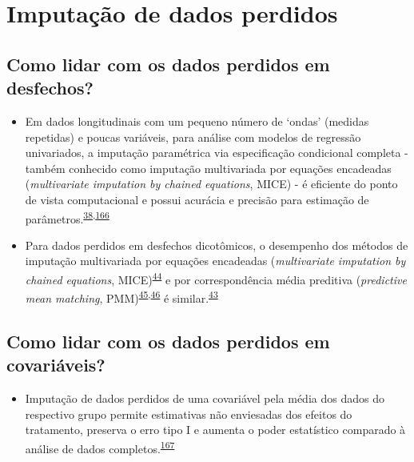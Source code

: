 \documentclass[
  a4paper,
]{book}
\providecommand{\tightlist}{%
  \setlength{\itemsep}{0pt}\setlength{\parskip}{0pt}}
\begin{document}
\hypertarget{imputacao-dados}{%
\section{Imputação de dados perdidos}\label{imputacao-dados}}

\hypertarget{como-lidar-com-os-dados-perdidos-em-desfechos}{%
\subsection{Como lidar com os dados perdidos em desfechos?}\label{como-lidar-com-os-dados-perdidos-em-desfechos}}

\begin{itemize}
\item
  Em dados longitudinais com um pequeno número de `ondas' (medidas repetidas) e poucas variáveis, para análise com modelos de regressão univariados, a imputação paramétrica via especificação condicional completa - também conhecido como imputação multivariada por equações encadeadas (\emph{multivariate imputation by chained equations}, MICE) - é eficiente do ponto de vista computacional e possui acurácia e precisão para estimação de parâmetros.\textsuperscript{\protect\hyperlink{ref-Heymans2022}{38},\protect\hyperlink{ref-Cao2022}{166}}
\item
  Para dados perdidos em desfechos dicotômicos, o desempenho dos métodos de imputação multivariada por equações encadeadas (\emph{multivariate imputation by chained equations}, MICE)\textsuperscript{\protect\hyperlink{ref-mice}{44}} e por correspondência média preditiva (\emph{predictive mean matching}, PMM)\textsuperscript{\protect\hyperlink{ref-rubin1986}{45},\protect\hyperlink{ref-little1988a}{46}} é similar.\textsuperscript{\protect\hyperlink{ref-austin2023}{43}}
\end{itemize}

\hypertarget{como-lidar-com-os-dados-perdidos-em-covariuxe1veis}{%
\subsection{Como lidar com os dados perdidos em covariáveis?}\label{como-lidar-com-os-dados-perdidos-em-covariuxe1veis}}

\begin{itemize}
\tightlist
\item
  Imputação de dados perdidos de uma covariável pela média dos dados do respectivo grupo permite estimativas não enviesadas dos efeitos do tratamento, preserva o erro tipo I e aumenta o poder estatístico comparado à análise de dados completos.\textsuperscript{\protect\hyperlink{ref-Kahan2014}{167}}
\end{itemize}
\end{document}
